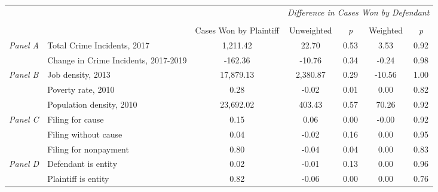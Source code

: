 \begin{tabular}{llccccc}
\toprule
 &  & \textit{} & \multicolumn{4}{c}{\textit{Difference in Cases Won by Defendant}} \\
\cline{4-7}
\\
 &  & Cases Won by Plaintiff & Unweighted & \emph{p} & Weighted & \emph{p} \\
\midrule
\multirow[c]{2}{.75cm}{\textit{Panel A}} & Total Crime Incidents, 2017 & 1,211.42 & 22.70 & 0.53 & 3.53 & 0.92 \\
 & Change in Crime Incidents, 2017-2019 & -162.36 & -10.76 & 0.34 & -0.24 & 0.98 \\
\cline{1-7}
\multirow[c]{3}{.75cm}{\textit{Panel B}} & Job density, 2013 & 17,879.13 & 2,380.87 & 0.29 & -10.56 & 1.00 \\
 & Poverty rate, 2010 & 0.28 & -0.02 & 0.01 & 0.00 & 0.82 \\
 & Population density, 2010 & 23,692.02 & 403.43 & 0.57 & 70.26 & 0.92 \\
\cline{1-7}
\multirow[c]{3}{.75cm}{\textit{Panel C}} & Filing for cause & 0.15 & 0.06 & 0.00 & -0.00 & 0.92 \\
 & Filing without cause & 0.04 & -0.02 & 0.16 & 0.00 & 0.95 \\
 & Filing for nonpayment & 0.80 & -0.04 & 0.04 & 0.00 & 0.83 \\
\cline{1-7}
\multirow[c]{2}{.75cm}{\textit{Panel D}} & Defendant is entity & 0.02 & -0.01 & 0.13 & 0.00 & 0.96 \\
 & Plaintiff is entity & 0.82 & -0.06 & 0.00 & 0.00 & 0.76 \\
\cline{1-7}
\bottomrule
\end{tabular}
